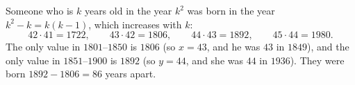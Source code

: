 Someone who is $k$ years old in the year $k^2$ was born in the year $k^2-k=k(k-1)$, which increases with $k$:
\[
42\cdot41=1722,\qquad 43\cdot42=1806,\qquad 44\cdot43=1892,\qquad 45\cdot44=1980 .
\]
The only value in $1801$--$1850$ is $1806$ (so $x=43$, and he was $43$ in $1849$), and the only value in $1851$--$1900$ is $1892$ (so $y=44$, and she was $44$ in $1936$). They were born $1892-1806=\boxed{86}$ years apart.
